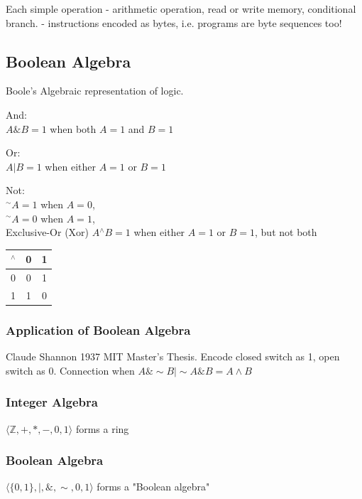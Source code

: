 \documentclass[10pt]{amsart}
\begin{document}
Each simple operation
- arithmetic operation, read or write memory, conditional branch.
- instructions encoded as bytes, 
i.e. programs are byte sequences too!

\subsection{Boolean Algebra}

Boole's Algebraic representation of logic.

And: \\
$A \& B = 1$ when both $A=1$ and $B=1$

Or: \\
$A | B = 1$ when either $A=1$ or $B=1$

Not: \\
${}^{\sim}A= 1$ when $A=0$, \\
${}^{\sim}A= 0$ when $A=1$, \\

Exclusive-Or (Xor)
$A {}^{\wedge} B = 1$ when either $A=1$ or $B=1$, but not both

\begin{center}
	\begin{tabular}{ l | c  c }
		${}^{\wedge}$ & 0 & 1 \\ \hline 
		0 & 0 & 1 \\
		1 & 1 & 0
	\end{tabular}
\end{center}

\subsubsection{Application of Boolean Algebra}

Claude Shannon 1937 MIT Master's Thesis. Encode closed switch as 1, open switch as 0. Connection when $A\& \sim B | \sim A \& B = A \wedge B$

\subsubsection{Integer Algebra}

$\langle \mathbb{Z}, +, *, - , 0 , 1 \rangle$ forms a ring

\subsubsection{Boolean Algebra}

$\langle \lbrace 0, 1 \rbrace , |, \& , \sim, 0, 1 \rangle $ forms a "Boolean algebra"
\end{document}
